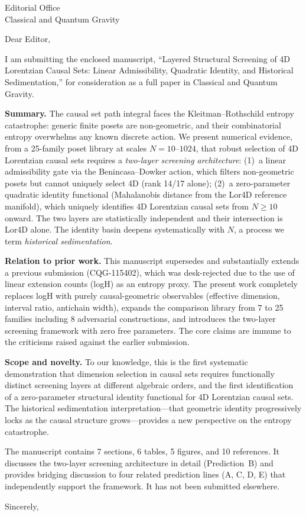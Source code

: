 \documentclass[12pt]{letter}
\begin{document}
\begin{letter}{Editorial Office\\Classical and Quantum Gravity}

\opening{Dear Editor,}

I am submitting the enclosed manuscript, ``Layered Structural Screening of 4D
Lorentzian Causal Sets: Linear Admissibility, Quadratic Identity, and Historical
Sedimentation,'' for consideration as a full paper in Classical and Quantum
Gravity.

\textbf{Summary.}
The causal set path integral faces the Kleitman--Rothschild entropy catastrophe:
generic finite posets are non-geometric, and their combinatorial entropy
overwhelms any known discrete action.
We present numerical evidence, from a 25-family poset library at scales
$N=10$--$1024$, that robust selection of 4D Lorentzian causal sets requires a
\emph{two-layer screening architecture}:
(1)~a linear admissibility gate via the Benincasa--Dowker action, which filters
non-geometric posets but cannot uniquely select 4D (rank 14/17 alone);
(2)~a zero-parameter quadratic identity functional (Mahalanobis distance from the
Lor4D reference manifold), which uniquely identifies 4D Lorentzian causal sets
from $N\geq 10$ onward.
The two layers are statistically independent and their intersection is Lor4D
alone.
The identity basin deepens systematically with $N$, a process we term
\emph{historical sedimentation}.

\textbf{Relation to prior work.}
This manuscript supersedes and substantially extends a previous submission
(CQG-115402), which was desk-rejected due to the use of linear extension counts
(logH) as an entropy proxy.
The present work completely replaces logH with purely causal-geometric
observables (effective dimension, interval ratio, antichain width), expands the
comparison library from 7 to 25 families including 8 adversarial constructions,
and introduces the two-layer screening framework with zero free parameters.
The core claims are immune to the criticisms raised against the earlier
submission.

\textbf{Scope and novelty.}
To our knowledge, this is the first systematic demonstration that dimension
selection in causal sets requires functionally distinct screening layers at
different algebraic orders, and the first identification of a zero-parameter
structural identity functional for 4D Lorentzian causal sets.
The historical sedimentation interpretation---that geometric identity
progressively locks as the causal structure grows---provides a new perspective on
the entropy catastrophe.

The manuscript contains 7 sections, 6 tables, 5 figures, and 10 references.
It discusses the two-layer screening architecture in detail (Prediction~B) and
provides bridging discussion to four related prediction lines (A, C, D, E) that
independently support the framework.
It has not been submitted elsewhere.

\closing{Sincerely,}

\end{letter}
\end{document}
